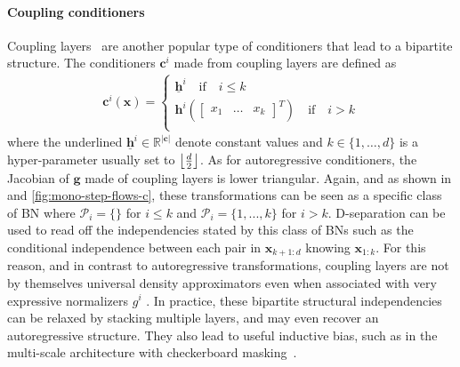 \paragraph{Coupling conditioners}
Coupling layers~\citep{NICE} are another popular type of conditioners that lead to a bipartite structure. The conditioners $\mathbf{c}^i$ made from coupling layers are defined as
\begin{align*}
    \mathbf{c}^i(\mathbf{x}) =
    \begin{cases}
    \underline{\mathbf{h}}^i \quad \text{if} \quad i \leq k\\
    \mathbf{h}^i\left(\begin{bmatrix} x_1 & \hdots & x_k \end{bmatrix}^T\right) \quad \text{if} \quad i > k\\
    \end{cases}
\end{align*}
where the underlined $\underline{\mathbf{h}}^i \in \mathbb{R}^{|\mathbf{c}|}$ denote constant values and $k \in \{1, \hdots, d\}$ is a hyper-parameter usually set to $\floor*{\frac{d}{2}}$.
As for autoregressive conditioners, the Jacobian of $\mathbf{g}$ made of coupling layers is lower triangular.
Again, and as shown in  and \ref{fig:mono-step-flows-c}, these transformations can be seen as a specific class of BN where $\mathcal{P}_i=\{\}$ for $i \leq k$ and $\mathcal{P}_i = \{1, ..., k\}$ for $i > k$.
D-separation can be used to read off the independencies stated by this class of BNs such as the conditional independence between each pair in $\mathbf{x}_{k+1:d}$ knowing $\mathbf{x}_{1:k}$.
For this reason, and in contrast to autoregressive transformations, coupling layers are not by themselves universal density approximators even when associated with very expressive normalizers $g^i$ \citep{wehenkel2020you}.
In practice, these bipartite structural independencies can be relaxed by stacking multiple layers, and may even recover an autoregressive structure. They also lead to useful inductive bias, such as in the multi-scale architecture with checkerboard masking~\citep{RealNVP, GLOW}.

